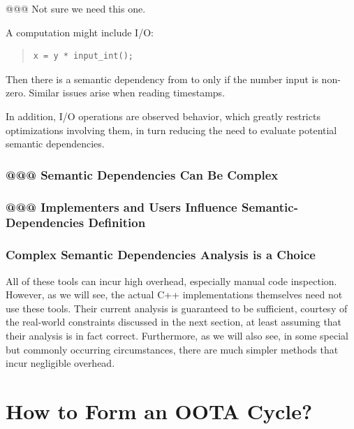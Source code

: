\documentclass[10]{article}
\begin{document}
@@@ Not sure we need this one.

A computation might include I/O:

\begin{quote}
\begin{verbatim}
x = y * input_int();
\end{verbatim}
\end{quote}

Then there is a semantic dependency from  to  only if
the number input is non-zero.
Similar issues arise when reading timestamps.

In addition, I/O operations are observed behavior, which greatly restricts
optimizations involving them, in turn reducing the need to evaluate
potential semantic dependencies.

\subsubsection{@@@ Semantic Dependencies Can Be Complex}
\label{sec:Semantic Dependencies Can Be Complex}

\subsubsection{@@@ Implementers and Users Influence Semantic-Dependencies Definition}
\label{sec:Implementers and Users Influence Semantic-Dependencies Definition}

\subsubsection{Complex Semantic Dependencies Analysis is a Choice}
\label{sec:Complex Semantic Dependencies Analysis is a Choice}

All of these tools can incur high overhead, especially manual code
inspection.
However, as we will see, the actual C++ implementations themselves need
not use these tools.
Their current analysis is guaranteed to be sufficient, courtesy of the
real-world constraints discussed in the next section, at least assuming
that their analysis is in fact correct.
Furthermore, as we will also see, in some special but commonly occurring
circumstances, there are much simpler methods that incur negligible overhead.

\section{How to Form an OOTA Cycle?}
\label{sec:How to Form an OOTA Cycle?}
\end{document}
